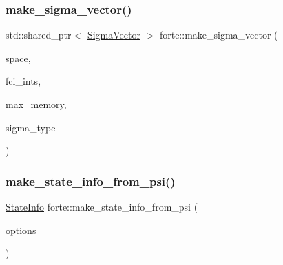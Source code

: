 \mbox{\label{namespaceforte_afb5436e49b32e47f78538bbd91ed7e48}} 
\subsubsection{\texorpdfstring{make\+\_\+sigma\+\_\+vector()}{make\_sigma\_vector()}\hspace{0.1cm}{\footnotesize\ttfamily [2/2]}}
{\footnotesize\ttfamily std\+::shared\+\_\+ptr$<$ \mbox{\hyperlink{classforte_1_1_sigma_vector}{Sigma\+Vector}} $>$ forte\+::make\+\_\+sigma\+\_\+vector (\begin{DoxyParamCaption}\item[{const std\+::vector$<$ \mbox{\hyperlink{namespaceforte_a2076c63fd7b8732004d9e1442ce527c1}{Determinant}} $>$ \&}]{space,  }\item[{std\+::shared\+\_\+ptr$<$ \mbox{\hyperlink{classforte_1_1_active_space_integrals}{Active\+Space\+Integrals}} $>$}]{fci\+\_\+ints,  }\item[{size\+\_\+t}]{max\+\_\+memory,  }\item[{\mbox{\hyperlink{namespaceforte_a94410e08f0cf9a0cfc5e53c70b6bf485}{Sigma\+Vector\+Type}}}]{sigma\+\_\+type }\end{DoxyParamCaption})}

\mbox{\label{namespaceforte_a65ba595a006985df2c59c9e690a8c525}} 
\subsubsection{\texorpdfstring{make\+\_\+state\+\_\+info\+\_\+from\+\_\+psi()}{make\_state\_info\_from\_psi()}}
{\footnotesize\ttfamily \mbox{\hyperlink{classforte_1_1_state_info}{State\+Info}} forte\+::make\+\_\+state\+\_\+info\+\_\+from\+\_\+psi (\begin{DoxyParamCaption}\item[{std\+::shared\+\_\+ptr$<$ \mbox{\hyperlink{classforte_1_1_forte_options}{Forte\+Options}} $>$}]{options }\end{DoxyParamCaption})}



